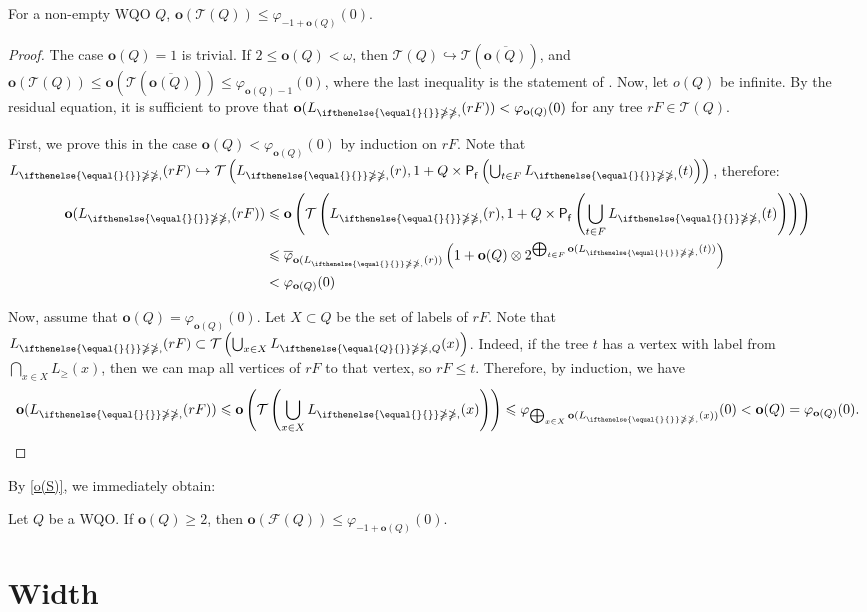 \documentclass[runningheads]{llncs}
\let \leq \leqslant
\let \geq \geqslant
\let \ngeq \ngeqslant
\let \phi \varphi
\let \embeds \hookrightarrow
\renewcommand \L [2][]{L_{\ifthenelse{\equal{#1}{}}\ngeq{\ngeq,#1}}(#2)}
\renewcommand \l [2][]{\o(\L[#1]{#2})}
\renewcommand \S [1][]{\mathsf{P_f^{#1}}}
\def \T {\mathcal{T}}
\def \F {\mathcal{F}}
\def \o {\textbf{o}}
\begin{document}
\begin{theorem}
    For a non-empty WQO $Q$, $\o(\T(Q)) \leq \phi_{-1 + \o(Q)}(0)$.
\end{theorem}
\begin{proof}
    The case $\o(Q) = 1$ is trivial. If $2 \leq \o(Q) < \omega$, then $\T(Q) \embeds \T\left(\overline{\o(Q)}\right)$, and $\o(\T(Q)) \leq \o\left(\T\left(\overline{\o(Q)}\right)\right) \leq \phi_{\o(Q)-1}(0)$, where the last inequality is the statement of \cite[proposition 1]{Selivanov2025}. Now, let $o(Q)$ be infinite. By the residual equation, it is sufficient to prove that $\l{rF} < \phi_{\o(Q)}(0)$ for any tree $rF \in \T(Q)$.
    
    First, we prove this in the case $\o(Q) < \phi_{\o(Q)}(0)$ by induction on $rF$. Note that $\L{rF} \embeds \T\left(\L{r}, 1 + Q \times \S\left(\bigcup_{t \in F} \L{t}\right)\right)$, therefore:
    \begin{align*}
        \l{rF}
        &\leq \o\left(\T\left(\L{r}, 1 + Q \times \S\left(\bigcup_{t \in F} \L{t}\right)\right)\right)\\
        &\leq \overline{\phi}_{\l{r}}\left(1 + \o(Q) \otimes 2^{\bigoplus_{t \in F} \l{t}}\right)\\
        &< \phi_{\o(Q)}(0)
    \end{align*}
    
    Now, assume that $\o(Q) = \phi_{\o(Q)}(0)$. Let $X \subset Q$ be the set of labels of $rF$. Note that $\L{rF} \subset \T\left(\bigcup_{x \in X} \L[Q]{x}\right)$. Indeed, if the tree $t$ has a vertex with label from $\bigcap_{x \in X} L_\geq(x)$, then we can map all vertices of $rF$ to that vertex, so $rF \leq t$. Therefore, by induction, we have 
    $$\l{rF} \leq \o\left(\T\left(\bigcup_{x \in X} \L{x}\right)\right) \leq \phi_{\bigoplus_{x \in X} \l{x}}(0) < \o(Q) = \phi_{\o(Q)}(0).$$
\end{proof}

By \cref{o(S)}, we immediately obtain:

\begin{corollary}
    Let $Q$ be a WQO. If $\o(Q) \geq 2$, then $\o(\F(Q)) \leq \phi_{-1+\o(Q)}(0)$.
\end{corollary}







\section{Width}\label{section w}
\end{document}
